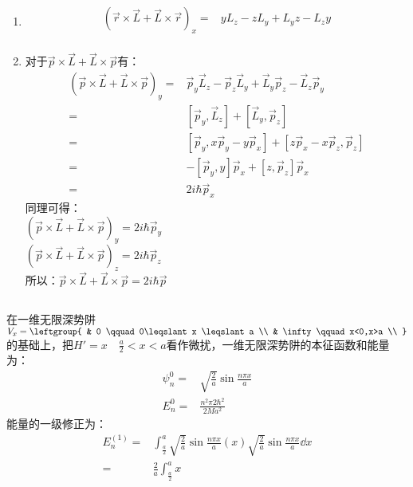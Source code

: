 \subsection{ }
\begin{enumerate}
\item 
\begin{equation}
\begin{aligned}
(\vec{r} \times \vec{L} + \vec{L} \times \vec{r})_{x} =& yL_{z}-zL_{y}+L_{y}z-L_{z}y \\
\end{aligned}
\end{equation}
\item 对于$\vec{p} \times \vec{L} + \vec{L} \times \vec{p}$有：
\begin{equation}
\begin{aligned}
(\vec{p} \times \vec{L} + \vec{L} \times \vec{p})_{y} =& \vec{p}_{y} \vec{L}_{z} - \vec{p}_{z} \vec{L}_{y} + \vec{L}_{y} \vec{p}_{z} - \vec{L}_{z} \vec{p}_{y} \\
=& [\vec{p}_{y},\vec{L}_{z}] + [\vec{L}_{y},\vec{p}_{z}] \\
=& [\vec{p}_{y},x\vec{p}_{y} - y\vec{p}_{x}] + [z\vec{p}_{x}-x\vec{p}_{z},\vec{p}_{z}] \\
=& -[\vec{p}_{y},y]\vec{p}_{x} + [z,\vec{p}_{z}]\vec{p}_{x} \\
=& 2i\hbar \vec{p}_{x}
\end{aligned}
\end{equation}
同理可得：\\
$(\vec{p} \times \vec{L} + \vec{L} \times \vec{p})_{y} =2i\hbar \vec{p}_{y} $ \\
$(\vec{p} \times \vec{L} + \vec{L} \times \vec{p})_{z} =2i\hbar \vec{p}_{z} $ \\
所以：$\vec{p} \times \vec{L} + \vec{L} \times \vec{p} = 2i\hbar \vec{p} $
\end{enumerate}

\subsection{ }
在一维无限深势阱$V_{x} = \leftgroup{
    & 0 \qquad 0\leqslant x \leqslant a \\
    & \infty \qquad x<0,x>a \\
}$的基础上，把$H' = x \quad \frac{a}{2} < x < a $看作微扰，一维无限深势阱的本征函数和能量为：\\
\begin{align}
\psi^{0}_{n}=& \sqrt{\frac{2}{a}} \sin{\frac{n\pi x}{a}}\\
E^{0}_{n}=& \frac{n^{2}\pi{2}\hbar^{2}}{2Ma^2}
\end{align}
能量的一级修正为：\\
\begin{equation}
\begin{aligned}
E^{(1)}_{n}=&\int^{a}_{\frac{a}{2}} \sqrt{\frac{2}{a}} \sin{\frac{n\pi x}{a}}(x)\sqrt{\frac{2}{a}} \sin{\frac{n\pi x}{a}} \dd{x} \\
=& \frac{2}{a} \int^{a}_{\frac{a}{2}} x
\end{aligned}
\end{equation}